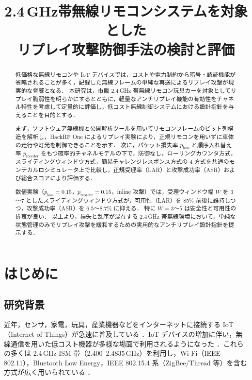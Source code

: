 \documentclass[twocolumn,10pt,a4paper]{jsarticle}
\title{2.4\,GHz帯無線リモコンシステムを対象とした\\リプレイ攻撃防御手法の検討と評価}
\date{}
\begin{document}
\baselineskip 12pt
\maketitle

\begin{abstract}
低価格な無線リモコンや IoT デバイスでは，コストや電力制約から暗号・認証機能が省略されることが多く，記録した無線フレームの単純な再送によるリプレイ攻撃が現実的な脅威となる．
本研究は，市販 2.4\,GHz 帯無線リモコン玩具カーを対象としてリプレイ脆弱性を明らかにするとともに，軽量なアンチリプレイ機能の有効性をチャネル特性を考慮して定量的に評価し，低コスト無線制御システムにおける設計指針を与えることを目的とする．

まず，ソフトウェア無線機と公開解析ツールを用いてリモコンフレームのビット列構造を解析し，HackRF One によるリプレイ実験により，正規リモコンを用いずに車体の走行や灯光を制御できることを示す．
次に，パケット損失率 $p_{\mathrm{loss}}$ と順序入れ替え率 $p_{\mathrm{reorder}}$ をもつ確率的チャネルモデルの下で，防御なし，ローリングカウンタ方式，スライディングウィンドウ方式，簡易チャレンジレスポンス方式の 4 方式を共通のモンテカルロシミュレータ上で比較し，正規受理率（LAR）と攻撃成功率（ASR）および総合スコアにより評価する．

数値実験（$p_{\mathrm{loss}} = 0.15$，$p_{\mathrm{reorder}} = 0.15$，inline 攻撃）では，受理ウィンドウ幅 $W$ を 3～7 としたスライディングウィンドウ方式が，可用性（LAR）を 85\% 前後に維持しつつ，攻撃成功率（ASR）を 6.5～8.7\% に抑える．
特に $W = 3$～$5$ は安全性と可用性の折衷が良い．
以上より，損失と乱序が混在する 2.4\,GHz 帯無線環境において，単純な状態管理のみでリプレイ攻撃を緩和するための実用的なアンチリプレイ設計指針を提示する．
\end{abstract}

\section{はじめに}

\subsection{研究背景}

近年，センサ，家電，玩具，産業機器などをインターネットに接続する IoT（Internet of Things）が急速に普及している \cite{Sinha2025IoTAnalytics}．IoT デバイスの増加に伴い，無線通信を用いた低コスト機器が多様な場面で利用されるようになった \cite{Carpenter2025IEEE802154}．これらの多くは 2.4\,GHz ISM 帯（2.400--2.4835\,GHz）を利用し，Wi-Fi（IEEE 802.11），Bluetooth Low Energy，IEEE 802.15.4 系（ZigBee/Thread 等）を含む方式が広く用いられている \cite{BLE2025Sensors}．
\end{document}
